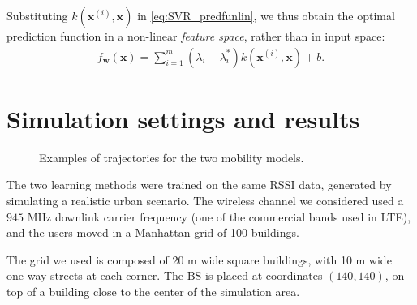\documentclass[conference, a4paper]{IEEEtran}
\begin{document}
Substituting $k(\mathbf{x}^{(i)},\mathbf{x})$ in \eqref{eq:SVR_predfunlin}, we thus obtain the optimal prediction function in a non-linear \textit{feature space}, rather than in input space:
\begin{align}
f_\mathbf{w}(\mathbf{x}) = \sum_{i=1}^{m} (\lambda_i-\lambda_i^*) k(\mathbf{x}^{(i)},\mathbf{x}) + b.
\end{align}

\section{Simulation settings and results}

\begin{figure}[!h]
\centering
{}
\hfil
{}
\caption{Examples of trajectories for the two mobility models.}
\label{fig:routes}
\end{figure}

The two learning methods were trained on the same RSSI data, generated by simulating a realistic urban scenario. The wireless channel we considered used a $945$ MHz downlink carrier frequency (one of the commercial bands used in LTE), and the users moved in a Manhattan grid of 100 buildings.

The grid we used is composed of 20 m wide square buildings, with 10 m wide one-way streets at each corner. The BS is placed at coordinates $(140,140)$, on top of a building close to the center of the simulation area.
\end{document}
